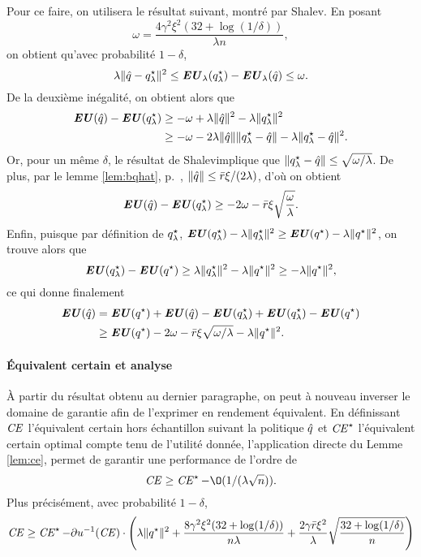 Pour ce faire, on utilisera le résultat suivant, montré par \cit Shalev. En posant
\begin{equation}
  \omega = \frac{4\gamma^2\xi^2(32 + \log(1/\delta))}{\lambda n},
\end{equation}
on obtient qu'avec probabilité $1-\delta$, 
\begin{equation}
\lambda\|\hat q-q^\star_\lambda\|^2 \leq \operatorname{\mbox{\textbf{\textit{EU}}}}_\lambda(q^\star_\lambda)- \operatorname{\mbox{\textbf{\textit{EU}}}}_\lambda(\hat q) \leq \omega.
\end{equation}
De la deuxième inégalité, on obtient alors que
\begin{align}
  \operatorname{\mbox{\textbf{\textit{EU}}}}(\hat q) - \operatorname{\mbox{\textbf{\textit{EU}}}}(q^\star_\lambda) & \geq -\omega + \lambda\|\hat q\|^2  -\lambda\|q^\star_\lambda\|^2\\
                       & \geq -\omega -2\lambda\|\hat q\|\|q^\star_\lambda-\hat q\| - \lambda\|q^\star_\lambda-\hat q\|^2.
\end{align}
Or, pour un même $\delta$, le résultat de Shalev\cit implique que $\|q^\star_\lambda-\hat q\| \leq
\sqrt{\omega/\lambda}$. De plus, par le lemme \ref{lem:bqhat}, p.~\pageref{lem:bqhat}, $\|\hat q\|\leq
\bar r\xi/(2\lambda)$, d'où on obtient
\begin{equation}
  \operatorname{\mbox{\textbf{\textit{EU}}}}(\hat q) - \operatorname{\mbox{\textbf{\textit{EU}}}}(q^\star_\lambda) \geq -2\omega -\bar r\xi\sqrt{\frac{\omega}{\lambda}}.
\end{equation}
Enfin, puisque par définition de $q^\star_\lambda$, $\operatorname{\mbox{\textbf{\textit{EU}}}}(q^\star_\lambda) - \lambda\|q^\star_\lambda\|^2 \geq \operatorname{\mbox{\textbf{\textit{EU}}}}(q^\star) -
\lambda\|q^\star\|^2$, on trouve alors que
\begin{equation}
  \operatorname{\mbox{\textbf{\textit{EU}}}}(q^\star_\lambda) - \operatorname{\mbox{\textbf{\textit{EU}}}}(q^\star) \geq \lambda\|q^\star_\lambda\|^2 - \lambda\|q^\star\|^2 \geq -\lambda\|q^\star\|^2,
\end{equation}
ce qui donne finalement
\begin{align}
  \operatorname{\mbox{\textbf{\textit{EU}}}}(\hat q) &= \operatorname{\mbox{\textbf{\textit{EU}}}}(q^\star) + \operatorname{\mbox{\textbf{\textit{EU}}}}(\hat q) - \operatorname{\mbox{\textbf{\textit{EU}}}}(q^\star_\lambda) + \operatorname{\mbox{\textbf{\textit{EU}}}}(q^\star_\lambda) - \operatorname{\mbox{\textbf{\textit{EU}}}}(q^\star)\\
           & \geq \operatorname{\mbox{\textbf{\textit{EU}}}}(q^\star) - 2\omega - \bar r\xi\sqrt{\omega/\lambda} - \lambda\|q^\star\|^2.
\end{align}

\paragraph{Équivalent certain et analyse}

À partir du résultat obtenu au dernier paragraphe, on peut à nouveau inverser le domaine
de garantie afin de l'exprimer en rendement équivalent. En définissant $\operatorname{\mbox{\textit{CE}}}$ l'équivalent
certain hors échantillon suivant la politique $\hat q$ et $\operatorname{\mbox{\textit{CE}}}^\star$ l'équivalent certain
optimal compte tenu de l'utilité donnée, l'application directe du Lemme \ref{lem:ce},
permet de garantir une performance de l'ordre de
\begin{equation}
  \nCE \geq \nCE^\star - \O(1/(\lambda\sqrt{n})).
\end{equation}
Plus précisément, avec probabilité $1-\delta$, 
\begin{equation}
  \operatorname{\mbox{\textit{CE}}} \geq \operatorname{\mbox{\textit{CE}}}^\star - \partial u^{-1}(\operatorname{\mbox{\textit{CE}}}) \cdot \left(\lambda\|q^\star\|^2 + \frac{8\gamma^2\xi^2(32+\log(1/\delta))}{n\lambda} + \frac{2\gamma\bar r\xi^2}{\lambda}\sqrt{\frac{32+\log(1/\delta)}{n}}\right)
\end{equation}

